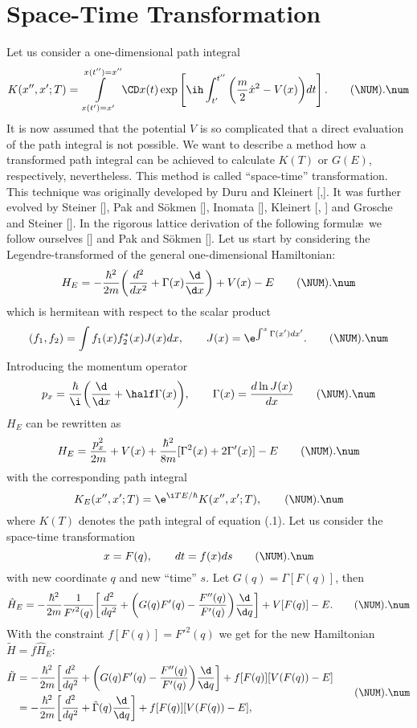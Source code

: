 \section{Space-Time Transformation}
Let us consider a one-dimensional path integral
\plus
$$K(x'',x';T)=
  \int\limits_{x(t')=x'}^{x(t'')=x''}\CD x(t)
  \exp\left[\ih\int_{t'}^{t''}\bigg({m\over2}\dot x^2
  -V(x)\bigg)dt\right].
  \tag\NUM.\num$$
It is now assumed that the potential $V$ is so complicated that a
direct evaluation of the path integral is not possible. We want to
describe a method how a transformed path integral can be achieved to
calculate $K(T)$ or $G(E)$, respectively, nevertheless. This method is
called ``space-time'' transformation. This technique was originally
developed by Duru and Kleinert [\DKa,\DKb]. It was further evolved by
Steiner [\STEa], Pak and S\"okmen [\PAKSc], Inomata [\INOd], Kleinert
[\KLEh, \KLEm] and Grosche and Steiner [\GRSb]. In the rigorous lattice
derivation of the following formul\ae\ we follow ourselves [\GRSb] and
Pak and S\"okmen [\PAKSc].
\newline
Let us start by considering the Legendre-transformed of the general
one-dimensional Hamiltonian:
\plus
$$H_E=-{\hbar^2\over2m}\bigg({d^2\over dx^2}
  +\Gamma(x){\d\over\d x}\bigg)+V(x)-E
  \tag\NUM.\num$$
which is hermitean with respect to the scalar product
\plus
$$(f_1,f_2)=\int f_1(x) f_2^*(x)J(x)dx,\qquad
  J(x)=\e^{\int^x\Gamma(x')dx'}.
  \tag\NUM.\num$$
Introducing the momentum operator
\plus
$$p_x={\hbar\over\i}\bigg({\d\over\d x}+\half\Gamma(x)\bigg),\qquad
  \Gamma(x)={d\ln J(x)\over dx}
  \tag\NUM.\num$$
$H_E$ can be rewritten as
\plus
$$H_E={p_x^2\over2m}+V(x)
  +{\hbar^2\over8m}[\Gamma^2(x)+2\Gamma'(x)]-E
  \tag\NUM.\num$$
with the corresponding path integral
\plus
$$K_E(x'',x';T)=\e^{\i TE/\hbar}K(x'',x';T),
  \tag\NUM.\num$$
where $K(T)$ denotes the path integral of equation (\NUM.1).
\newline
Let us consider the space-time transformation
\plus
$$x=F(q), \qquad  dt=f(x)ds
  \tag\NUM.\num$$
with new coordinate $q$ and new ``time'' $s$.
Let $G(q)=\Gamma[F(q)]$, then
\plus
$$\hat H_E=-{\hbar^2\over2m}{1\over {F'}^2(q)}
  \bigg[{d^2\over dq^2}+\bigg(G(q)F'(q)-{F''(q)\over F'(q)}\bigg)
  {\d\over\d q}\bigg]+V[F(q)]-E.
  \tag\NUM.\num$$
With the constraint $f[F(q)]={F'}^2(q)$ we get for the new
Hamiltonian $\tilde H=f\hat H_E$:
\plus
$$\aligned
  \tilde H&=-{\hbar^2\over2m}
  \bigg[{d^2\over dq^2}+\bigg(G(q)F'(q)-{F''(q)\over F'(q)}\bigg)
  {\d\over\d q}\bigg]+f[F(q)][V(F(q))-E]
  \\
  &=-{\hbar^2\over2m}\bigg[{d^2\over dq^2}
  +\tilde\Gamma(q){\d\over\d q}\bigg]+f[F(q)][V(F(q))-E],
  \endaligned
  \tag\NUM.\num$$
